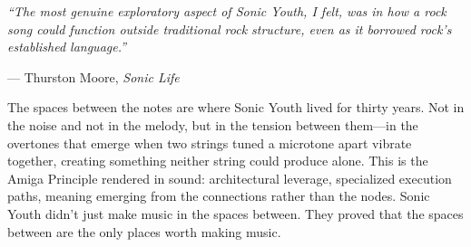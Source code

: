\documentclass[11pt,letterpaper]{article}
\begin{document}
\vspace{1em}

\begin{quotebox}
\textit{``The most genuine exploratory aspect of Sonic Youth, I felt, was in how a rock song could function outside traditional rock structure, even as it borrowed rock's established language.''}

\vspace{0.5em}
--- Thurston Moore, \textit{Sonic Life}

\vspace{1em}
The spaces between the notes are where Sonic Youth lived for thirty years. Not in the noise and not in the melody, but in the tension between them---in the overtones that emerge when two strings tuned a microtone apart vibrate together, creating something neither string could produce alone. This is the Amiga Principle rendered in sound: architectural leverage, specialized execution paths, meaning emerging from the connections rather than the nodes. Sonic Youth didn't just make music in the spaces between. They proved that the spaces between are the only places worth making music.
\end{quotebox}
\end{document}
